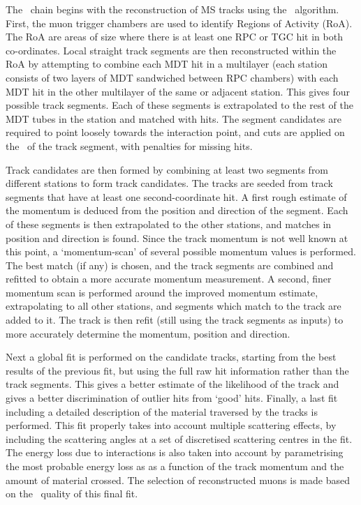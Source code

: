 The \staco\ chain begins with the reconstruction of MS tracks using the \muonboy\
algorithm. First, the muon trigger chambers are used to identify Regions of
Activity (RoA). The RoA are areas of size \deltaetadeltaphi{0.4}{0.4} where
there is at least one RPC or TGC hit in both co-ordinates. Local straight track
segments are then reconstructed within the RoA by attempting to combine each MDT
hit in a multilayer (each station consists of two layers of MDT sandwiched
between RPC chambers) with each MDT hit in the other multilayer of the same or
adjacent station. This gives four possible track segments. Each of these segments
is extrapolated to the rest of the MDT tubes in the station and matched with hits. 
The segment candidates are required to point loosely towards the
interaction point, and cuts are applied on the \chisquared\ of the track
segment, with penalties for missing hits. 

Track candidates are then formed by combining at least
two segments from different stations to form track candidates. The tracks are
seeded from track segments that have at least one second-coordinate hit. A first
rough estimate of the momentum is deduced from the position and direction of the
segment. Each of these segments is then extrapolated to the other stations, and
matches in position and direction is found. Since the track momentum is not well
known at this point, a `momentum-scan' of several possible momentum values is
performed. The best match (if any) is chosen, and the track segments are
combined and refitted to obtain a more accurate momentum measurement. A second,
finer momentum scan is performed around the improved momentum estimate,
extrapolating to all other stations, and segments which match to the track are added to
it.
The track is then refit (still using the track segments as inputs) to more accurately determine the momentum, position and
direction. 

Next a global fit is performed on the candidate tracks, starting from the
best results of the previous fit, but using the full raw hit information rather
than the track segments. This gives
a better estimate of the likelihood of the track and gives a better
discrimination of outlier hits from `good' hits. Finally, a last fit including
a detailed description of the material traversed by the tracks is performed.
This fit properly takes into account multiple scattering effects, by including
the
scattering angles at a set of discretised scattering centres in the
fit. The energy loss due to interactions is also taken into account  by
parametrising the most probable energy loss as as a function of the track momentum and
the amount of material crossed. The selection of reconstructed muons is made
based on the \chisquared\ quality of this final fit.

